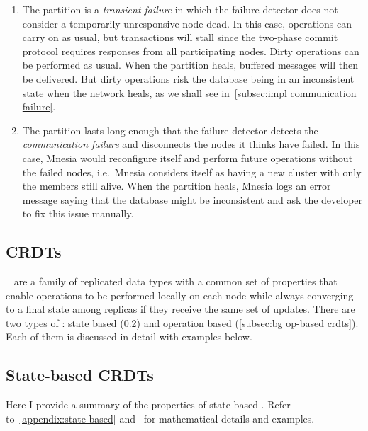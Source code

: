 \begin{enumerate}[label={NP\arabic*.},ref={NP\arabic*}]
  \item The partition is a \emph{transient failure} in which the failure 
  detector does not consider
  a temporarily unresponsive node dead. In this case, operations can carry on
  as usual, but transactions will stall since the two-phase commit protocol requires
  responses from all participating nodes. Dirty operations can be performed as usual.
  When the partition heals, buffered messages will then be delivered.
  But dirty operations risk the database being in an inconsistent 
  state when the network heals, as we shall see in~\cref{subsec:impl communication failure}.
  \label{itm:transient partition}
  \item The partition lasts long enough that the failure detector detects the
  \emph{communication failure} and disconnects the nodes it thinks have failed. 
  In this case, Mnesia would 
  reconfigure itself and perform future operations without the failed nodes, i.e.\ Mnesia considers
  itself as having a new cluster with only the members still alive. 
  When the partition heals, Mnesia
  logs an error message saying that the database might be inconsistent
  and ask the developer to fix this issue manually. \label{itm:comm failure}
\end{enumerate}


\subsection{CRDTs} \label{sec:bg crdt}

~\cite{preguica2018CRDT,shapiro2011CRDT} are a family of replicated 
data types with a common set of properties 
that enable operations to be performed locally on each node while always converging
to a final state among replicas if they receive the same set of updates. 
There are two types of : state 
based (\cref{subsec:bg state-based crdt}) and operation 
based (\cref{subsec:bg op-based crdts}). 
Each of them is discussed in detail with examples below.

\subsection{State-based CRDTs}  \label{subsec:bg state-based crdt}

Here I provide a summary of the properties of state-based . 
Refer to~\cref{appendix:state-based} 
and~\cite{vanderlinde2016delta-CRDTs,almeida2018DeltaCRDT,shapiro2011CRDT,preguica2018CRDT}
for mathematical details and examples. 

